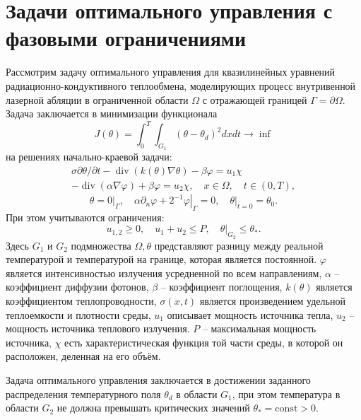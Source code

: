 

\section{Задачи оптимального управления с фазовыми ограничениями}
\label{sec:ch3:sec2}
%
Рассмотрим задачу оптимального
управления для квазилинейных уравнений радиационно-кондуктивного
теплообмена, моделирующих процесс внутривенной
лазерной абляции в ограниченной области $\Omega$ с отражающей границей $\Gamma=\partial\Omega$.
Задача заключается в минимизации функционала
\[ J(\theta)=\int_{0}^{T} \int_{G_{1}}\left(\theta-\theta_{d}\right)^{2} dx dt \rightarrow \inf \]
на решениях начально-краевой задачи:
\begin{equation}
    \label{eq:3_2:1}
    \begin{gathered}
        \sigma \partial \theta / \partial t-\operatorname{div}(k(\theta)
        \nabla \theta)-\beta \varphi=u_{1} \chi \\
        -\operatorname{div}(\alpha \nabla \varphi)+\beta \varphi=u_{2}
        \chi, \quad x \in \Omega, \quad t \in(0, T),
    \end{gathered}
\end{equation}
\begin{equation}
    \label{eq:3_2:2}
    \theta=\left.0\right|_{\Gamma},
    \quad \alpha \partial_{n} \varphi
    +\left.2^{-1} \varphi\right|_{\Gamma}=0,
    \left.\quad \theta\right|_{t=0}=\theta_{0}.
\end{equation}
При этом учитываются ограничения:
\[ u_{1,2} \geq 0, \quad u_{1}+u_{2} \leq P, \left.\quad \theta\right|_{G_{2}} \leq \theta_{*}. \]
Здесь $G_{1}$ и $G_{2}$ подмножества $\Omega, \theta$
представляют разницу между реальной температурой
и температурой на границе, которая является постоянной.
$\varphi$ является интенсивностью излучения усредненной по всем направлениям,
$\alpha$ -- коэффициент диффузии фотонов, $\beta$ -- коэффициент поглощения,
$k(\theta)$ является коэффициентом теплопроводности, $\sigma(x, t)$
является произведением удельной теплоемкости и плотности среды, $u_{1}$
описывает мощность источника тепла, $u_{2}$ -- мощность источника теплового излучения.
$P$ -- максимальная мощность источника,
$\chi$ есть характеристическая функция той части среды,
в которой он расположен, деленная на его объём.

\begin{remark}
    Задача оптимального управления заключается в достижении заданного распределения
    температурного поля $\theta_{d}$ в области $G_{1}$, при этом температура в области
    $G_{2}$ не должна превышать критических значений $\theta_{*}=\text{const}>0$.
\end{remark}

